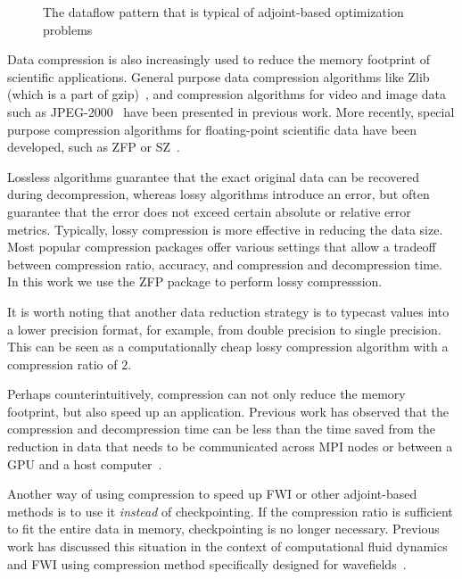 \documentclass[conference]{IEEEtran}
\begin{document}
\begin{figure}
\begin{center}

\end{center}
\caption{The dataflow pattern that is typical of adjoint-based optimization problems}
\label{fig:dataflow}
\end{figure}


Data compression is also increasingly used to reduce the memory footprint of
scientific applications. General purpose data compression algorithms like Zlib
(which is a part of gzip)~\cite{deutsch1996zlib}, and compression algorithms for
video and image data such as JPEG-2000~\cite{skodras2001jpeg} have been
presented in previous work. More recently, special purpose compression
algorithms for floating-point scientific data have been developed, such as ZFP
or SZ~\cite{Kaklamanis:2012aa,lindstrom2014fixed,di2018efficient}.

Lossless algorithms guarantee that the exact original data can be recovered
during decompression, whereas lossy algorithms introduce an error, but often
guarantee that the error does not exceed certain absolute or relative error
metrics. Typically, lossy compression is more effective in reducing the data
size. Most popular compression packages offer various settings that allow a
tradeoff between compression ratio, accuracy, and compression and decompression
time. In this work we use the ZFP package to perform lossy compresssion.

It is worth noting that another data reduction strategy is to typecast values
into a lower precision format, for example, from double precision to single
precision. This can be seen as a computationally cheap lossy compression
algorithm with a compression ratio of $2$.

Perhaps counterintuitively, compression can not only reduce the memory
footprint, but also speed up an application. Previous work has observed that the
compression and decompression time can be less than the time saved from the
reduction in data that needs to be communicated across MPI nodes or between a
GPU and a host computer~\cite{gpu-compression}.

Another way of using compression to speed up FWI or other adjoint-based methods
is to use it \emph{instead} of checkpointing. If the compression ratio is
sufficient to fit the entire data in memory, checkpointing is no longer
necessary. Previous work has discussed this situation in the context of
computational fluid dynamics~\cite{cyr2015towards} and FWI using compression
method specifically designed for
wavefields~\cite{dalmau2014lossy,boehm2016wavefield}.
\end{document}
